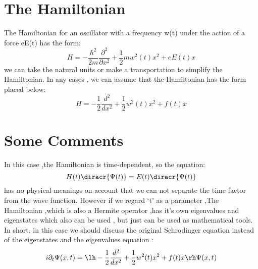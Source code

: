 





\begin{frame}
\maketitle
\end{frame}

\begin{frame}
\tableofcontents[hidesubsections,sections={<1-8>}]
\end{frame}

\section{The Hamiltonian}
\begin{frame}
The Hamiltonian for an oscillator with a frequency w(t) under the action of a force eE(t) has the form:
\[H=-\frac{\hbar^2}{2m}\frac{\partial^2}{\partial x^2}+\frac{1}{2}mw^2(t)x^2+eE(t)x\]
we can take the natural  units or make a transportation to simplify the Hamiltonian. In any cases , we can assume that  the Hamiltonian has the form placed below:
\[H=-\frac{1}{2}\frac{d^2}{dx^2}+\frac{1}{2}w^2(t)x^2+f(t)x\]
\end{frame}

\section{Some Comments}
\begin{frame}
In this case ,the Hamiltonian is time-dependent, so the equation:
\[H(t)\diracr{\Psi(t)}=E(t)\diracr{\Psi(t)}\]
has no physical meanings on account that we can not separate the time factor from the wave function. However if we regard ‘t’ as a parameter ,The Hamiltonian ,which is also a Hermite operator ,has it’s own eigenvalues and eigenstates which also can be used , but just can be used as mathematical tools. In short, in this case we should discuss the original Schrodinger equation instead of the eigenstates and the eigenvalues equation :
\[i\partial_t \Psi(x,t)=\lh-\frac{1}{2}\frac{d^2}{dx^2}+\frac{1}{2}w^2(t)x^2+f(t)x\rh\Psi(x,t)\]
\end{frame}

